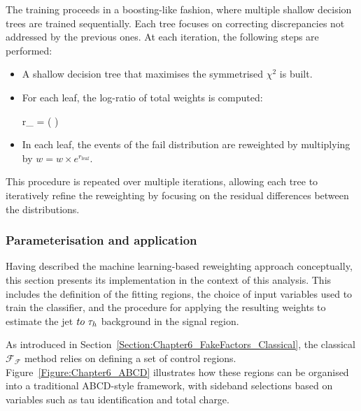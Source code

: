 The training proceeds in a boosting-like fashion, where multiple shallow decision trees are trained sequentially. Each tree focuses on correcting discrepancies not addressed by the previous ones. At each iteration, the following steps are performed:

\begin{itemize}
    \item A shallow decision tree that maximises the symmetrised $\chi^2$ is built.
    \item For each leaf, the log-ratio of total weights is computed:
    \begin{equation_pad}
        r_ = \log \left(  \right)
    \end{equation_pad}
    \item In each leaf, the events of the fail distribution are reweighted by multiplying by $w = w \times e^{r{_\text{leaf}}}$.
\end{itemize}

This procedure is repeated over multiple iterations, allowing each tree to iteratively refine the reweighting by focusing on the residual differences between the distributions.

\subsubsection{Parameterisation and application}

Having described the machine learning-based reweighting approach conceptually, this section presents its implementation in the context of this analysis. This includes the definition of the fitting regions, the choice of input variables used to train the classifier, and the procedure for applying the resulting weights to estimate the jet $to~\tau_h$ background in the signal region. 

As introduced in Section~\ref{Section:Chapter6_FakeFactors_Classical}, the classical $\mathcal{F_F}$ method relies on defining a set of control regions. Figure~\ref{Figure:Chapter6_ABCD} illustrates how these regions can be organised into a traditional ABCD-style framework, with sideband selections based on variables such as tau identification and total charge.

